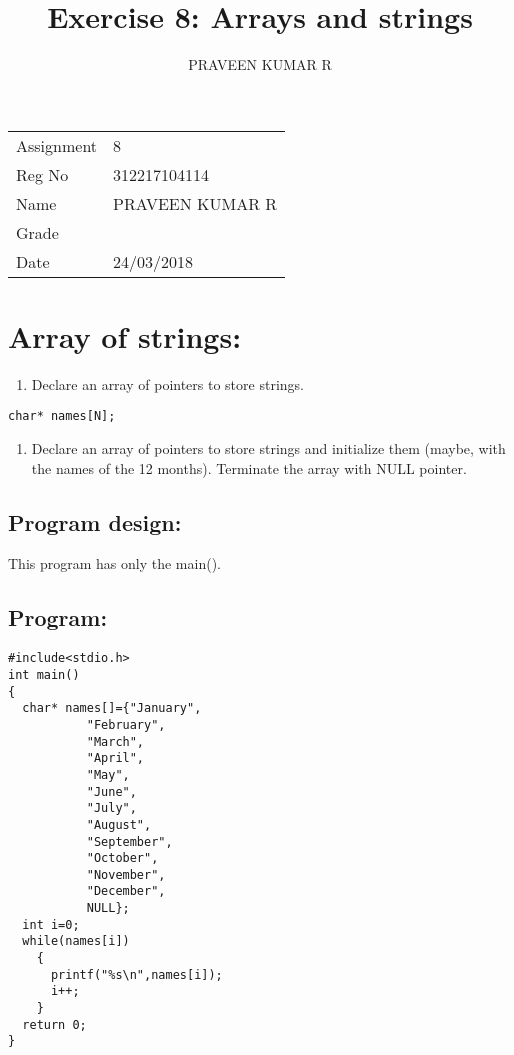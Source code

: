 \documentclass[11pt]{article}
\author{PRAVEEN KUMAR R}
\date{}
\title{Exercise 8: Arrays and strings}
\begin{document}
\maketitle
\begin{export}
\linespread{1.2}
\end{export}
\begin{center}
\begin{tabular}{ll}
Assignment & 8\\
Reg No & 312217104114\\
Name & PRAVEEN KUMAR R\\
Grade & \\
Date & 24/03/2018\\
\end{tabular}
\end{center}
\linespread{1.5}

\section{Array of strings:}
\label{sec-1}
\begin{enumerate}
\item Declare an array of pointers to store strings.
\end{enumerate}
\begin{verbatim}
char* names[N];
\end{verbatim}
\begin{enumerate}
\item Declare an array of pointers to store strings and initialize them (maybe, with the names of the 12 months). Terminate the array with NULL pointer.
\end{enumerate}

\subsection*{Program design:}
\label{sec-1-1}
This program has only the main().

\subsection*{Program:}
\label{sec-1-2}
\begin{verbatim}
#include<stdio.h>
int main()
{
  char* names[]={"January",
		   "February",
		   "March",
		   "April",
		   "May",
		   "June",
		   "July",
		   "August",
		   "September",
		   "October",
		   "November",
		   "December",
		   NULL};
  int i=0;
  while(names[i])
    {
      printf("%s\n",names[i]);
      i++;
    }  
  return 0;
}
\end{verbatim}
\end{document}
